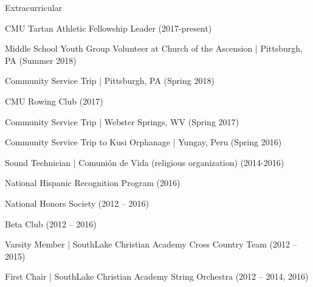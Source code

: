 \documentclass{resume} %
\begin{document}

\begin{Section}{Extracurricular} \itemsep -3pt
\item CMU Tartan Athletic Fellowship Leader (2017-present)
\item Middle School Youth Group Volunteer at Church of the Ascension | Pittsburgh, PA (Summer 2018)
\item Community Service Trip | Pittsburgh, PA (Spring 2018)
\item CMU Rowing Club (2017)
\item Community Service Trip | Webster Springs, WV (Spring 2017)
\item Community Service Trip to Kusi Orphanage | Yungay, Peru (Spring 2016)
\item Sound Technician | Comuni\'{o}n de Vida (religious organization) (2014-2016)
\item National Hispanic Recognition Program (2016)
\item National Honors Society (2012 – 2016)
\item Beta Club (2012 – 2016)
\item Varsity Member | SouthLake Christian Academy Cross Country Team (2012 – 2015)
\item First Chair | SouthLake Christian Academy String Orchestra (2012 – 2014, 2016)



\end{Section}
\end{document}
